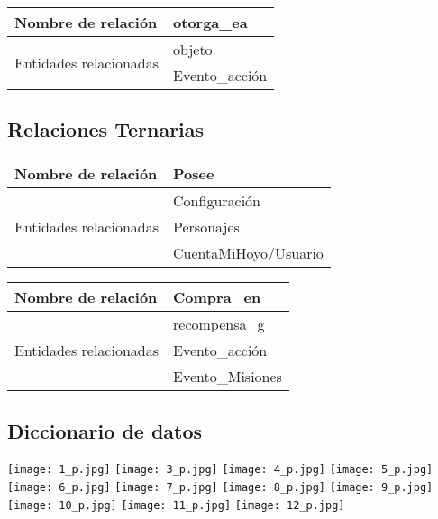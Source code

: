 \documentclass{report}
\begin{document}
\begin{center}    
    \begin{tabular}{|p{3cm}|p{5cm}|}
    \hline
    Nombre de relación& otorga\_ea\\ 
    \hline
    \hline
    \multirow{3}{6em}{Entidades relacionadas}& objeto \\ &Evento\_acción \\ 
    \hline
    \end{tabular}
\end{center}

\subsection{Relaciones Ternarias}
\begin{center}    
    \begin{tabular}{|p{3cm}|p{5cm}|}
    \hline
    Nombre de relación& Posee\\ 
    \hline
    \hline
    \multirow{3}{6em}{Entidades relacionadas}& Configuración \\ &Personajes \\ &CuentaMiHoyo/Usuario\\ 
    \hline
    \end{tabular}
\end{center}

\begin{center}    
    \begin{tabular}{|p{3cm}|p{5cm}|}
    \hline
    Nombre de relación& Compra\_en\\ 
    \hline
    \hline
    \multirow{3}{6em}{Entidades relacionadas}& recompensa\_g \\ &Evento\_acción \\ &Evento\_Misiones\\ 
    \hline
    \end{tabular}
\end{center}


\subsection{Diccionario de datos}
\texttt{[image: 1\_p.jpg]}
\newpage
\texttt{[image: 3\_p.jpg]}
\texttt{[image: 4\_p.jpg]}
\newpage
\texttt{[image: 5\_p.jpg]}
\texttt{[image: 6\_p.jpg]}
\newpage
\texttt{[image: 7\_p.jpg]}
\texttt{[image: 8\_p.jpg]}
\newpage
\texttt{[image: 9\_p.jpg]}
\texttt{[image: 10\_p.jpg]}
\newpage
\texttt{[image: 11\_p.jpg]}
\texttt{[image: 12\_p.jpg]}
\end{document}
